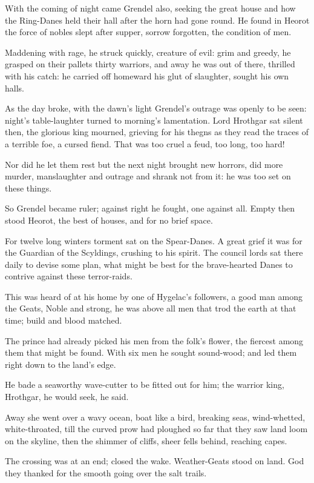 \documentclass[a4paper]{article}
\begin{document}
{With the coming of night came Grendel also,
seeking the great house and how the Ring-Danes
held their hall after the horn had gone round.
He found in Heorot the force of nobles
slept after supper, sorrow forgotten,
the condition of men. 

Maddening with rage,
he struck quickly, creature of evil:
grim and greedy, he grasped on their pallets
thirty warriors, and away he was out of there,
thrilled with his catch: he carried off homeward
his glut of slaughter, sought his own halls.

As the day broke, with the dawn's light
Grendel's outrage was openly to be seen:
night's table-laughter turned to morning's
lamentation. Lord Hrothgar
sat silent then, the glorious king mourned, 
grieving for his thegns as they read the 
traces of a terrible foe,
a cursed fiend. That was too cruel a feud,
too long, too hard!

\newpage
Nor did he let them rest
but the next night brought new horrors,
did more murder, manslaughter and outrage
and shrank not from it: he was too set on these things.

So Grendel became ruler; against right he fought,
one against all. Empty then stood Heorot,
the best of houses, and for no brief space.

For twelve long winters torment sat
on the Spear-Danes. A great grief it was for the
Guardian of the Scyldings, crushing to his
spirit. The council lords sat there daily to devise some plan, 
what might be best for the brave-hearted Danes 
to contrive against these terror-raids.

This was heard of at his home by one of Hygelac's followers,
a good man among the Geats, Noble and strong,
he was above all men that trod the earth at that time; 
build and blood matched.

The prince had already picked his men
from the folk's flower, the fiercest among them
that might be found. With six men
he sought sound-wood; and led them right down 
to the land's edge.

He bade a seaworthy 
wave-cutter to be fitted out for him; the warrior king, 
Hrothgar, he would seek, he said.

Away she went over a wavy ocean,
boat like a bird, breaking seas,
wind-whetted, white-throated,
till the curved prow had ploughed so far
that they saw land loom on the skyline,
then the shimmer of cliffs, sheer fells behind,
reaching capes.

The crossing was at an end;
closed the wake. Weather-Geats
stood on land. God they thanked
for the smooth going over the salt trails.

}
\end{document}
